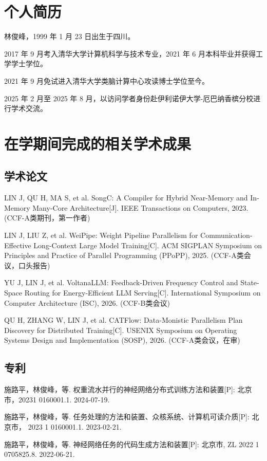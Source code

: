 
\begin{resume}

  \section*{个人简历}

  林俊峰，1999 年 1 月 23 日出生于四川。

  2017 年 9 月考入清华大学计算机科学与技术专业，2021 年 6 月本科毕业并获得工学学士学位。

  2021 年 9 月免试进入清华大学类脑计算中心攻读博士学位至今。

  2025 年 2 月至 2025 年 8 月，以访问学者身份赴伊利诺伊大学-厄巴纳香槟分校进行学术交流。


  \section*{在学期间完成的相关学术成果}

  \subsection*{学术论文}

  \begin{achievements}
    \item LIN J, QU H, MA S, et al. SongC: A Compiler for Hybrid Near-Memory and In-Memory Many-Core Architecture[J]. IEEE Transactions on Computers, 2023. (CCF-A类期刊，第一作者)
    \item LIN J, LIU Z, et al. WeiPipe: Weight Pipeline Parallelism for Communication-Effective Long-Context Large Model Training[C]. ACM SIGPLAN Symposium on Principles and Practice of Parallel Programming (PPoPP), 2025. (CCF-A类会议，口头报告)
    \item YU J, LIN J, et al. VoltanaLLM: Feedback-Driven Frequency Control and State-Space Routing for Energy-Efficient LLM Serving[C]. International Symposium on Computer Architecture (ISC), 2026. (CCF-B类会议)
    \item QU H, ZHANG W, LIN J, et al. CATFlow: Data-Monistic Parallelism Plan Discovery for Distributed Training[C]. USENIX Symposium on Operating Systems Design and Implementation (SOSP), 2026. (CCF-A类会议，在审)
  \end{achievements}


  \subsection*{专利}

  \begin{achievements}
    \item 施路平，林俊峰，等. 权重流水并行的神经网络分布式训练方法和装置[P]: 北京市，20231 0160001.1. 2024-07-19.
    \item 施路平，林俊峰，等. 任务处理的方法和装置、众核系统、计算机可读介质[P]: 北京市， 2023 1 0160001.1. 2023-02-21.
    \item 施路平，林俊峰，等. 神经网络任务的代码生成方法和装置[P]: 北京市, ZL 2022 1 0705825.8. 2022-06-21.
  \end{achievements}


\end{resume}